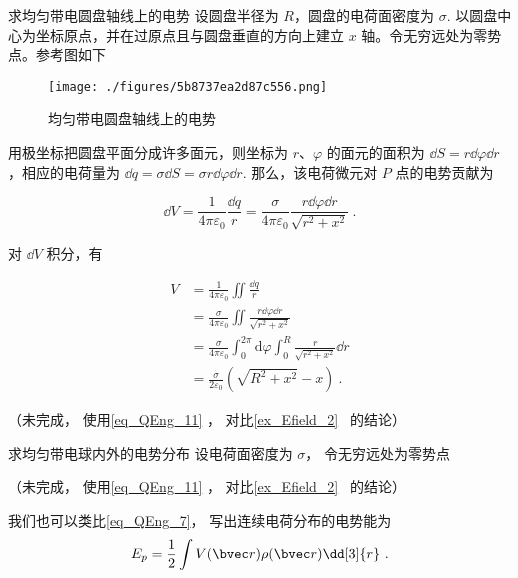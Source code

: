 \begin{example}{求均匀带电圆盘轴线上的电势}
设圆盘半径为 $R$，圆盘的电荷面密度为 $\sigma$. 以圆盘中心为坐标原点，并在过原点且与圆盘垂直的方向上建立 $x$ 轴。令无穷远处为零势点。参考图如下
\begin{figure}[ht]
\centering
\texttt{[image: ./figures/5b8737ea2d87c556.png]}
\caption{均匀带电圆盘轴线上的电势} \label{fig_QEng_1}
\end{figure}

用极坐标把圆盘平面分成许多面元，则坐标为 $r$、$\varphi$ 的面元的面积为 $\dd S=r\dd \varphi \dd r$，相应的电荷量为 $\dd q=\sigma\dd S=\sigma r\dd \varphi \dd r$. 那么，该电荷微元对 $P$ 点的电势贡献为

\begin{equation}
\dd V =\frac{1}{4 \pi \varepsilon_{0}}\frac{\dd q }{r}=\frac{\sigma}{4 \pi\varepsilon_{0} }\frac{r \dd \varphi \dd r}{ \sqrt{r^{2}+x^{2}}}~.
\end{equation}

对 $\dd V$ 积分，有

\begin{equation}
\begin{aligned}
V & =\frac{1}{4 \pi \varepsilon_{0}}\iint \frac{\dd q }{r}\\
& =\frac{\sigma }{4 \pi \varepsilon_{0}}\iint \frac{r \dd \varphi \dd r}{ \sqrt{r^{2}+x^{2}}}\\
& = \frac{\sigma}{4 \pi \varepsilon_{0}} \int_{0}^{2 \pi} \mathrm{d} \varphi \int_{0}^{R} \frac{r}{\sqrt{r^{2}+x^{2}}}\dd r\\ 
& = \frac{\sigma}{2 \varepsilon_{0}}\left(\sqrt{R^{2}+x^{2}}-x\right)~.
\end{aligned}
\end{equation}


（未完成， 使用\autoref{eq_QEng_11} ， 对比\autoref{ex_Efield_2}~ 的结论）
\end{example}

\begin{example}{求均匀带电球内外的电势分布}
设电荷面密度为 $\sigma$， 令无穷远处为零势点

（未完成， 使用\autoref{eq_QEng_11} ， 对比\autoref{ex_Efield_2}~ 的结论）
\end{example}

我们也可以类比\autoref{eq_QEng_7}， 写出连续电荷分布的电势能为
\begin{equation}\label{eq_QEng_8}
E_p = \frac 12 \int V(\bvec r) \rho(\bvec r) \dd[3]{r}~.
\end{equation}

